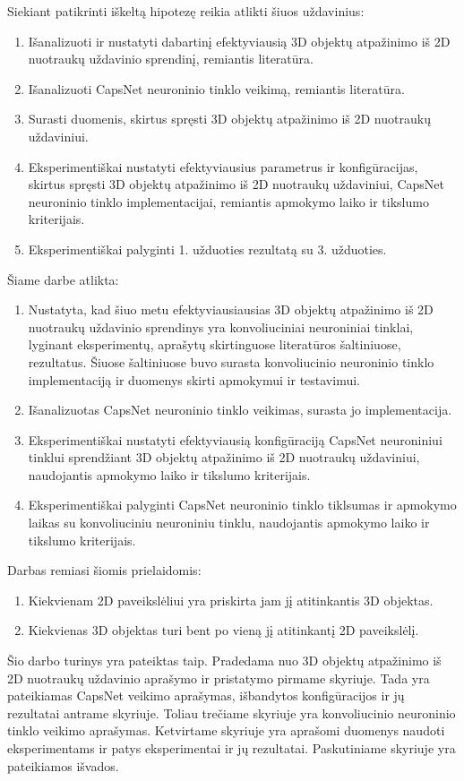 Siekiant patikrinti iškeltą hipotezę reikia atlikti šiuos uždavinius:

\begin{enumerate}
	\item Išanalizuoti ir nustatyti dabartinį efektyviausią 3D objektų atpažinimo iš 2D nuotraukų uždavinio sprendinį, remiantis literatūra.
	\item Išanalizuoti CapsNet neuroninio tinklo veikimą, remiantis literatūra.
	\item Surasti duomenis, skirtus spręsti 3D objektų atpažinimo iš 2D nuotraukų uždaviniui.
	\item Eksperimentiškai nustatyti efektyviausius parametrus ir konfigūracijas, skirtus spręsti 3D objektų atpažinimo iš 2D nuotraukų uždaviniui, CapsNet neuroninio tinklo implementacijai, remiantis apmokymo laiko ir tikslumo kriterijais.
	\item Eksperimentiškai palyginti 1. užduoties rezultatą su 3. užduoties.
\end{enumerate}

Šiame darbe atlikta:

\begin{enumerate}
	\item Nustatyta, kad šiuo metu efektyviausiausias 3D objektų atpažinimo iš 2D nuotraukų uždavinio sprendinys yra konvoliuciniai neuroniniai tinklai, lyginant eksperimentų, aprašytų skirtinguose literatūros šaltiniuose, rezultatus. Šiuose šaltiniuose buvo surasta konvoliucinio neuroninio tinklo implementaciją ir duomenys skirti apmokymui ir testavimui.
	\item Išanalizuotas CapsNet neuroninio tinklo veikimas, surasta jo implementacija.
	\item Eksperimentiškai nustatyti efektyviausią konfigūraciją CapsNet neuroniniui tinklui sprendžiant 3D objektų atpažinimo iš 2D nuotraukų uždaviniui, naudojantis apmokymo laiko ir tikslumo kriterijais.
	\item Eksperimentiškai palyginti CapsNet neuroninio tinklo tiklsumas ir apmokymo laikas su konvoliuciniu neuroniniu tinklu, naudojantis apmokymo laiko ir tikslumo kriterijais.
\end{enumerate}

Darbas remiasi šiomis prielaidomis:

\begin{enumerate}
	\item Kiekvienam 2D paveikslėliui yra priskirta jam jį atitinkantis 3D objektas.
	\item Kiekvienas 3D objektas turi bent po vieną jį atitinkantį 2D paveikslėlį.
\end{enumerate}

Šio darbo turinys yra pateiktas taip. Pradedama nuo 3D objektų atpažinimo iš 2D nuotraukų uždavinio aprašymo ir pristatymo pirmame skyriuje. Tada yra pateikiamas CapsNet veikimo aprašymas, išbandytos konfigūracijos ir jų rezultatai antrame skyriuje. Toliau trečiame skyriuje yra konvoliucinio neuroninio tinklo veikimo aprašymas. Ketvirtame skyriuje yra aprašomi duomenys naudoti eksperimentams ir patys eksperimentai ir jų rezultatai. Paskutiniame skyriuje yra pateikiamos išvados.
